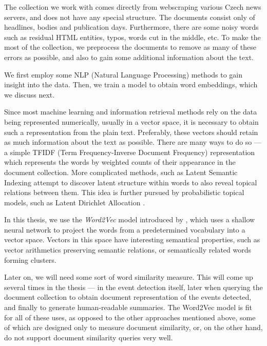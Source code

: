 The collection we work with comes directly from webscraping various Czech news servers, and does not have any special structure. The documents consist only of headlines, bodies and publication days. Furthermore, there are some noisy words such as residual HTML entities, typos, words cut in the middle, etc. To make the most of the collection, we preprocess the documents to remove as many of these errors as possible, and also to gain some additional information about the text.

We first employ some NLP (Natural Language Processing) methods to gain insight into the data. Then, we train a model to obtain word embeddings, which we discuss next.

Since most machine learning and information retrieval methods rely on the data being represented numerically, usually in a vector space, it is necessary to obtain such a representation from the plain text. Preferably, these vectors should retain as much information about the text as possible. There are many ways to do so --- a simple TFIDF (Term Frequency-Inverse Document Frequency) representation \citep{information-retrieval} which represents the words by weighted counts of their appearance in the document collection. More complicated methods, such as Latent Semantic Indexing \citep{lsi} attempt to discover latent structure within words to also reveal topical relations between them. This idea is further pursued by probabilistic topical models, such as Latent Dirichlet Allocation \citep{lda}.

In this thesis, we use the \textit{Word2Vec} model introduced by \cite{word2vec, distributed-representations, linguistic-regularities}, which uses a shallow neural network to project the words from a predetermined vocabulary into a vector space. Vectors in this space have interesting semantical properties, such as vector arithmetics preserving semantic relations, or semantically related words forming clusters.

Later on, we will need some sort of word similarity measure. This will come up several times in the thesis --- in the event detection itself, later when querying the document collection to obtain document representation of the events detected, and finally to generate human-readable summaries. The Word2Vec model is fit for all of these uses, as opposed to the other approaches mentioned above, some of which are designed only to measure document similarity, or, on the other hand, do not support document similarity queries very well.


